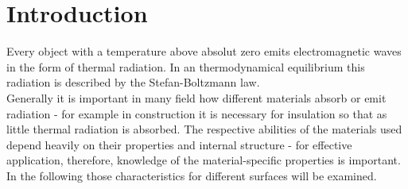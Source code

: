 \section{Introduction}

Every object with a temperature above absolut zero emits electromagnetic waves in the form of thermal radiation. In an thermodynamical equilibrium
this radiation is described by the Stefan-Boltzmann law. \\ 
Generally it is important in many field how different materials absorb or emit radiation - for example in construction it is necessary for insulation so that
as little thermal radiation is absorbed. The respective abilities of the materials used depend heavily on their properties and internal
structure - for effective application, therefore, knowledge of the material-specific properties is important. \\
In the following those characteristics for different surfaces will be examined.